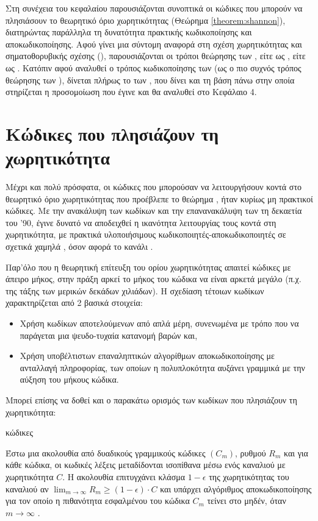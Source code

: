 Στη συνέχεια του κεφαλαίου παρουσιάζονται συνοπτικά οι κώδικες που μπορούν να πλησιάσουν το θεωρητικό όριο χωρητικότητας  (Θεώρημα \ref{theorem:shannon}), διατηρώντας παράλληλα τη δυνατότητα πρακτικής κωδικοποίησης και αποκωδικοποίησης. Αφού γίνει μια σύντομη αναφορά στη σχέση χωρητικότητας και σηματοθορυβικής σχέσης (), παρουσιάζονται οι τρόποι θεώρησης των , είτε ως , είτε ως . Κατόπιν αφού αναλυθεί ο τρόπος κωδικοποίησης των  (ως ο πιο συχνός τρόπος θεώρησης των ), δίνεται πλήρως το  των , που δίνει και τη βάση πάνω στην οποία στηρίζεται η προσομοίωση που έγινε και θα αναλυθεί στο Κεφάλαιο 4.

\section{Κώδικες που πλησιάζουν τη χωρητικότητα}

Μέχρι και πολύ πρόσφατα, οι κώδικες που μπορούσαν να λειτουργήσουν κοντά στο θεωρητικό όριο χωρητικότητας που προέβλεπε το θεώρημα , ήταν κυρίως μη πρακτικοί κώδικες. Με την ανακάλυψη των  κωδίκων και την επανανακάλυψη των  τη δεκαετία του '90, έγινε δυνατό να αποδειχθεί η ικανότητα λειτουργίας τους κοντά στη χωρητικότητα, με πρακτικά υλοποιήσιμους κωδικοποιητές-αποκωδικοποιητές σε σχετικά χαμηλά , όσον αφορά το κανάλι . 

Παρ'όλο που η θεωρητική επίτευξη του ορίου χωρητικότητας απαιτεί κώδικες με άπειρο μήκος, στην πράξη αρκεί το μήκος του κώδικα να είναι αρκετά μεγάλο (π.χ. της τάξης των μερικών δεκάδων χιλιάδων). Η σχεδίαση τέτοιων κωδίκων χαρακτηρίζεται από 2 βασικά στοιχεία:
\begin{itemize}
\item Χρήση κωδίκων αποτελούμενων από απλά μέρη, συνενωμένα με τρόπο που να παράγεται μια ψευδο-τυχαία κατανομή βαρών και,
\item Χρήση υποβέλτιστων επαναληπτικών αλγορίθμων αποκωδικοποίησης με ανταλλαγή  πληροφορίας, των οποίων η πολυπλοκότητα αυξάνει γραμμικά με την αύξηση του μήκους κώδικα.
\end{itemize}

Μπορεί επίσης να δοθεί και ο παρακάτω ορισμός των κωδίκων που πλησιάζουν τη χωρητικότητα:
\begin{definition} κώδικες

Έστω μια ακολουθία από δυαδικούς γραμμικούς κώδικες $\left( C_m \right)$, ρυθμού $R_m$ και για κάθε κώδικα, οι κωδικές λέξεις μεταδίδονται ισοπίθανα μέσω ενός καναλιού με χωρητικότητα $C$. Η ακολουθία επιτυγχάνει κλάσμα $1-\epsilon$ της χωρητικότητας του καναλιού αν $\lim_{m\to \infty}R_m\geq\left(1-\epsilon\right)\cdot C$ και υπάρχει αλγόριθμος αποκωδικοποίησης για τον οποίο η πιθανότητα εσφαλμένου  του κώδικα $C_m$ τείνει στο μηδέν, όταν $m\to \infty$ \cite{pfister2005capacity}.
\label{def:capacity approaching codes}
\end{definition}

